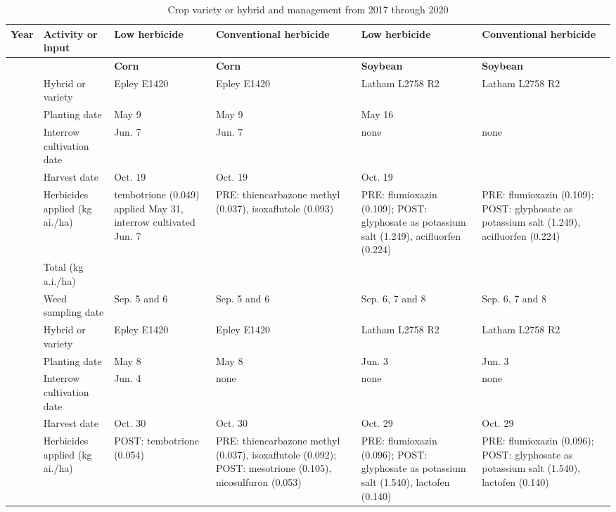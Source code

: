 \documentclass[
]{article}
\begin{document}
\begin{landscape}\begin{table}

\caption{\label{tab:herb-id}Crop variety or hybrid and management from 2017 through 2020}
\centering
\begin{threeparttable}
\begin{tabular}[t]{>{\raggedright\arraybackslash}p{2em}|>{\raggedright\arraybackslash}p{8em}|>{\raggedright\arraybackslash}p{14em}|>{\raggedright\arraybackslash}p{14em}|>{\raggedright\arraybackslash}p{14em}|>{\raggedright\arraybackslash}p{14em}}
\hline
Year & Activity or input & Low herbicide & Conventional herbicide & Low herbicide & Conventional herbicide\\
\hline
\textbf{} & \textbf{} & \textbf{Corn} & \textbf{Corn} & \textbf{Soybean} & \textbf{Soybean}\\
2017 & Hybrid or variety & Epley E1420 & Epley E1420 & Latham L2758 R2 & Latham L2758 R2\\
 & Planting date & May 9 & May 9 & May 16 & \\
 & Interrow cultivation date & Jun. 7 & Jun. 7 & none & none\\
 & Harvest date & Oct. 19 & Oct. 19 & Oct. 19 & \\
 & Herbicides applied (kg ai./ha) & tembotrione (0.049) applied May 31, interrow cultivated Jun. 7 & PRE: thiencarbazone methyl (0.037), isoxaflutole (0.093) & PRE: flumioxazin (0.109); POST: glyphosate as potassium salt (1.249), acifluorfen (0.224) & PRE: flumioxazin (0.109); POST: glyphosate as potassium salt (1.249), acifluorfen (0.224)\\
 & Total (kg a.i./ha) & 0.049 & 0.13 & 1.581 & 1.581\\
 & Weed sampling date & Sep. 5 and 6 & Sep. 5 and 6 & Sep. 6, 7 and 8 & Sep. 6, 7 and 8\\
2018 & Hybrid or variety & Epley E1420 & Epley E1420 & Latham L2758 R2 & Latham L2758 R2\\
 & Planting date & May 8 & May 8 & Jun. 3 & Jun. 3\\
 & Interrow cultivation date & Jun. 4 & none & none & none\\
 & Harvest date & Oct. 30 & Oct. 30 & Oct. 29 & Oct. 29\\
 & Herbicides applied (kg ai./ha) & POST: tembotrione (0.054) & PRE: thiencarbazone methyl (0.037), isoxaflutole (0.092); POST: mesotrione (0.105), nicosulfuron (0.053) & PRE: flumioxazin (0.096); POST: glyphosate as potassium salt (1.540), lactofen (0.140) & PRE: flumioxazin (0.096); POST: glyphosate as potassium salt (1.540), lactofen (0.140)\\

\end{tabular}
\end{threeparttable}
\end{table}
\end{landscape}
\end{document}
